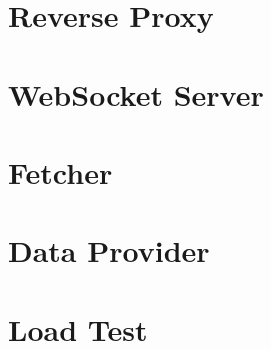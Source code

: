 \chapter{Reverse Proxy}
\label{chapter:appendix-reverseProxy}



\chapter{WebSocket Server}
\label{chapter:appendix-webSocketServer}




\chapter{Fetcher}
\label{chapter:appendix-fetcher}




\chapter{Data Provider}
\label{chapter:appendix-dataProvider}




\chapter{Load Test}
\label{chapter:appendix-loadtest}

